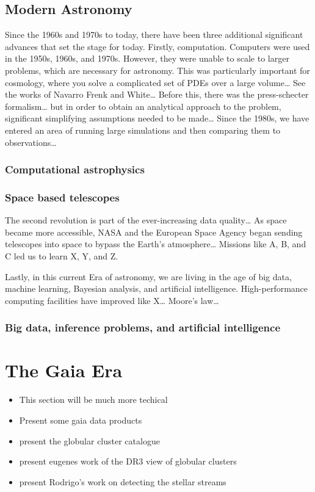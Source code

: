 \subsection{Modern Astronomy}
Since the 1960s and 1970s to today, there have been three additional significant advances that set the stage for today. Firstly, computation. Computers were used in the 1950s, 1960s, and 1970s. However, they were unable to scale to larger problems, which are necessary for astronomy. This was particularly important for cosmology, where you solve a complicated set of PDEs over a large volume… See the works of Navarro Frenk and White… Before this, there was the press-schecter formalism… but in order to obtain an analytical approach to the problem, significant simplifying assumptions needed to be made… Since the 1980s, we have entered an area of running large simulations and then comparing them to observations… 

\subsubsection*{Computational astrophysics}

\subsubsection*{Space based telescopes}

The second revolution is part of the ever-increasing data quality… As space became more accessible, NASA and the European Space Agency began sending telescopes into space to bypass the Earth's atmosphere… Missions like A, B, and C led us to learn X, Y, and Z. 


Lastly, in this current Era of astronomy, we are living in the age of big data, machine learning, Bayesian analysis, and artificial intelligence. High-performance computing facilities have improved like X… Moore's law… 


\subsubsection*{Big data, inference problems, and artificial intelligence }

\section{The Gaia Era}
    \begin{itemize}
        \item This section will be much more techical 
        \item Present some gaia data products 
        \item present the globular cluster catalogue
        \item present eugenes work of the DR3 view of globular clusters 
        \item present Rodrigo's work on detecting the stellar streams 
    \end{itemize}



